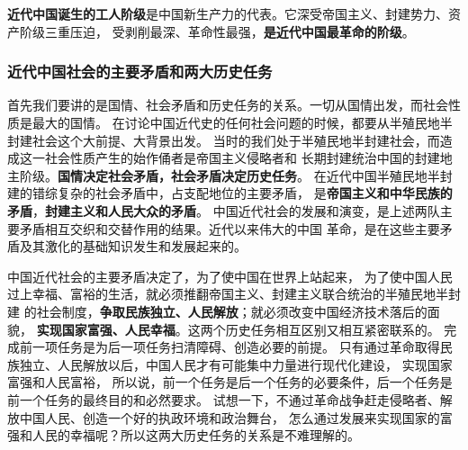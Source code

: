 \documentclass[10pt, UTF8]{book} %
\begin{document}
\textbf{近代中国诞生的工人阶级}是中国新生产力的代表。它深受帝国主义、封建势力、资产阶级三重压迫，
受剥削最深、革命性最强，\textbf{是近代中国最革命的阶级}。

\subsubsection{近代中国社会的主要矛盾和两大历史任务}

首先我们要讲的是国情、社会矛盾和历史任务的关系。一切从国情出发，而社会性质是最大的国情。
在讨论中国近代史的任何社会问题的时候，都要从半殖民地半封建社会这个大前提、大背景出发。
当时的我们处于半殖民地半封建社会，而造成这一社会性质产生的始作俑者是帝国主义侵略者和
长期封建统治中国的封建地主阶级。\textbf{国情决定社会矛盾，社会矛盾决定历史任务}。
在近代中国半殖民地半封建的错综复杂的社会矛盾中，占支配地位的主要矛盾，
是\textbf{帝国主义和中华民族的矛盾}，\textbf{封建主义和人民大众的矛盾}。
中国近代社会的发展和演变，是上述两队主要矛盾相互交织和交替作用的结果。近代以来伟大的中国
革命，是在这些主要矛盾及其激化的基础知识发生和发展起来的。

中国近代社会的主要矛盾决定了，为了使中国在世界上站起来，
为了使中国人民过上幸福、富裕的生活，就必须推翻帝国主义、封建主义联合统治的半殖民地半封建
的社会制度，\textbf{争取民族独立、人民解放}；就必须改变中国经济技术落后的面貌，
\textbf{实现国家富强、人民幸福}。这两个历史任务相互区别又相互紧密联系的。
完成前一项任务是为后一项任务扫清障碍、创造必要的前提。
只有通过革命取得民族独立、人民解放以后，中国人民才有可能集中力量进行现代化建设，
实现国家富强和人民富裕，
所以说，前一个任务是后一个任务的必要条件，后一个任务是前一个任务的最终目的和必然要求。
试想一下，不通过革命战争赶走侵略者、解放中国人民、创造一个好的执政环境和政治舞台，
怎么通过发展来实现国家的富强和人民的幸福呢？所以这两大历史任务的关系是不难理解的。
\end{document}
